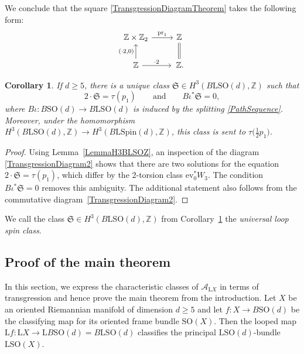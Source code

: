 \documentclass[10pt,a4paper]{amsart}
\numberwithin{equation}{section}
\newtheorem{Corollary}[Theorem]{Corollary}
\newcommand{\Z}{\mathbb{Z}}
\newcommand{\A}{\mathcal{A}}
\newcommand{\SO}{\mathrm{SO}}
\newcommand{\Spin}{\mathrm{Spin}}
\renewcommand{\L}{\mathrm{L}}
\begin{document}
We conclude that the square \eqref{TransgressionDiagramTheorem} takes the following form:
\begin{equation}\label{TransgressionDiagram2}
\begin{tikzcd}
 \Z \times \Z_2 \ar[r, "\mathrm{pr}_1"] & \Z \ar[d, equal] \\
 \Z \ar[u, "(\cdot 2\text{,} 0)"] \ar[r, "\cdot 2"] &\, \Z.
\end{tikzcd}
\end{equation}


\begin{Corollary} \label{CorollaryStringClass}
If $d \geq 5$, there is a unique class $\mathfrak{S} \in H^3(B\L\SO(d), \Z)$ such that
\begin{equation*}
2 \cdot \mathfrak{S} = \tau(p_1) \qquad \text{and} \qquad B\iota^*\mathfrak{S} = 0,
\end{equation*}
where $B\iota\colon B\SO(d) \to B\L\SO(d)$ is induced by the splitting \eqref{PathSequence}.
Moreover, under the homomorphism $H^3(B\L\SO(d), \Z) \to H^3(B\L\Spin(d), \Z)$, this class is sent to $\tau\big(\frac{1}{2}p_1\big)$.
\end{Corollary}

\begin{proof}
Using Lemma~\ref{LemmaH3BLSOZ}, an inspection of the diagram \eqref{TransgressionDiagram2} shows that there are two solutions for the equation $2 \cdot \mathfrak{S} = \tau(p_1)$, which differ by the 2-torsion class $\mathrm{ev}_0^*W_3$.
The condition $B\iota^*\mathfrak{S} = 0$ removes this ambiguity.
The additional statement also follows from the commutative diagram~\eqref{TransgressionDiagram2}.
\end{proof}

\begin{Definition} \label{DefinitionStringClass}
We call the class $\mathfrak{S} \in H^3(B\L\SO(d), \Z)$ from Corollary~\ref{CorollaryStringClass} the \emph{universal loop spin class}.
\end{Definition}

\subsection{Proof of the main theorem}

In this section, we express the characteristic classes of $\A_{\L X}$ in terms of transgression and hence prove the main theorem from the introduction.
Let $X$ be an oriented Riemannian manifold of dimension $d\geq5$ and let $f\colon X \to B\SO(d)$ be the classifying map for its oriented frame bundle $\SO(X)$.
Then the looped map $\L f\colon \L X \to \L B\SO(d) = B\L\SO(d)$ classifies the principal $\L\SO(d)$-bundle $\L\SO(X)$.
\end{document}
